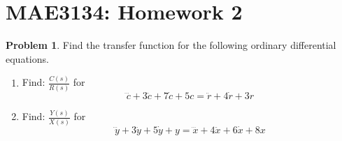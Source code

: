 \documentclass[10pt]{article}
\date{}
\theoremstyle{definition}
\newtheorem{prob}{Problem}[section]
\newenvironment{subprob}%
{\renewcommand{\theenumi}{\alph{enumi}}\renewcommand{\labelenumi}{(\theenumi)}\begin{enumerate}}%
{\end{enumerate}}%
\begin{document}
\pagestyle{empty}
\section*{MAE3134: Homework 2}
\vspace*{-0.4cm}


\begin{prob}
    Find the transfer function for the following ordinary differential equations.
    \begin{subprob}
    \item Find: \( \frac{C(s)}{R(s)}\) for \[ \dddot{c} + 3 \ddot{c} + 7 \dot{c} + 5 c = \ddot{r} + 4 \dot{r} + 3 r \] 
    \item Find: \( \frac{Y(s)}{X(s)}\) for \[ \dddot{y} + 3 \ddot{y} + 5 \dot{y} + y = \dddot{x} + 4 \ddot{x} + 6 \dot{x} + 8 x\] 
    \end{subprob}
\end{prob}
\end{document}
